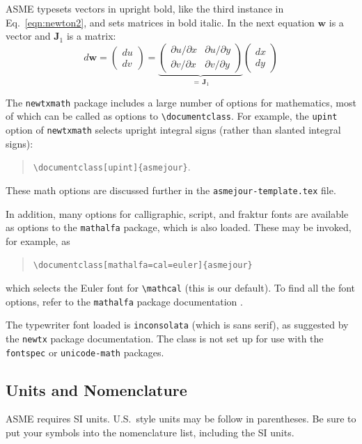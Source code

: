 \documentclass[largesc,upint,varvw,barcolor=Red4,nocopyright,hyphenate,balance,lang-second=french,lang=english]{asmejour}
\begin{document}
ASME typesets vectors in upright bold, like the third instance in Eq.\ \eqref{eqn:newton2}, and sets matrices in bold italic. In the next equation $\mathbf{w}$ is a vector and  $\bm{J}_1$ is a matrix:
\begin{equation}\label{eqn:dw}
d\mathbf{w} =
   \begin{pmatrix}
 	du \\ dv
   \end{pmatrix} = 
   \underbrace{\begin{pmatrix}
	 \partial u/\partial x &  \partial u/\partial y \\
	 \partial v/\partial x &  \partial v/\partial y
   \end{pmatrix}}_{=\,\bm{J}_1}  \begin{pmatrix}
 	dx \\ dy
   \end{pmatrix} 
\end{equation}

The \texttt{newtxmath} package includes a large number of options for mathematics, most of which can be called as options to \verb|\documentclass|. For example, the \texttt{upint} option of \texttt{newtxmath} selects upright integral signs (rather than slanted integral signs):
\begin{quote}
\verb|\documentclass[upint]{asmejour}|. 
\end{quote}  
These math options are discussed further in the \texttt{asmejour-template.tex} file. 

In addition, many options for calligraphic, script, and fraktur fonts are available as options to the \texttt{mathalfa} package, which is also loaded. These may be invoked, for example, as 
\begin{quote}
\verb|\documentclass[mathalfa=cal=euler]{asmejour}| 
\end{quote}
which selects the Euler font for \verb|\mathcal| (this is our default). To find all the font options, refer to the \texttt{mathalfa} package documentation \cite{sharpe2}.

The typewriter font loaded is \texttt{inconsolata} (which is sans serif), as suggested by the \texttt{newtx} package documentation. The class is not set up for use with the \texttt{fontspec} or \texttt{unicode-math} packages.


\subsection{Units and Nomenclature} ASME requires SI units. U.S.\ style units may be follow in parentheses. Be sure to put your symbols into the nomenclature list, including the SI units.
\end{document}
